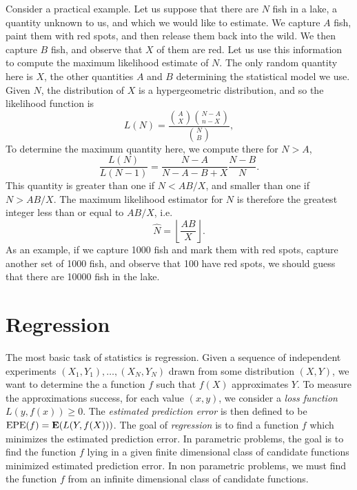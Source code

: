 \begin{example}
	Consider a practical example. Let us suppose that there are $N$ fish in a lake, a quantity unknown to us, and which we would like to estimate. We capture $A$ fish, paint them with red spots, and then release them back into the wild. We then capture $B$ fish, and observe that $X$ of them are red. Let us use this information to compute the maximum likelihood estimate of $N$. The only random quantity here is $X$, the other quantities $A$ and $B$ determining the statistical model we use. Given $N$, the distribution of $X$ is a hypergeometric distribution, and so the likelihood function is
	\[ L(N) = \frac{{A \choose X} { N-A \choose n-X }}{{N \choose B}}, \]
	To determine the maximum quantity here, we compute there for $N > A$,
	\[ \frac{L(N)}{L(N-1)} = \frac{N-A}{N-A-B+X} \frac{N-B}{N}. \]
	This quantity is greater than one if $N < AB / X$, and smaller than one if $N > AB/X$. The maximum likelihood estimator for $N$ is therefore the greatest integer less than or equal to $AB/X$, i.e.
	\[ \widehat{N} = \left\lfloor \frac{AB}{X} \right\rfloor. \]
	As an example, if we capture 1000 fish and mark them with red spots, capture another set of 1000 fish, and observe that 100 have red spots, we should guess that there are 10000 fish in the lake.
\end{example}

\chapter{Regression}

The most basic task of statistics is regression. Given a sequence of independent experiments $(X_1, Y_1), \dots, (X_N, Y_N)$ drawn from some distribution $(X,Y)$, we want to determine the a function $f$ such that $f(X)$ approximates $Y$. To measure the approximations success, for each value $(x,y)$, we consider a \emph{loss function} $L(y,f(x)) \geq 0$. The \emph{estimated prediction error} is then defined to be $\text{EPE}(f) = \operatorname{\mathbf{E}}(L(Y,f(X)))$. The goal of \emph{regression} is to find a function $f$ which minimizes the estimated prediction error. In parametric problems, the goal is to find the function $f$ lying in a given finite dimensional class of candidate functions minimized estimated prediction error. In non parametric problems, we must find the function $f$ from an infinite dimensional class of candidate functions.

